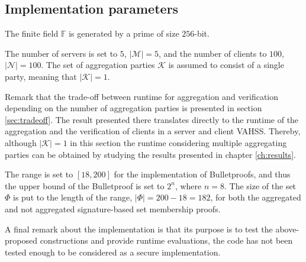 \subsection*{Implementation parameters}
The finite field $\mathds{F}$ is generated by a prime of size $256$-bit.

The number of servers is set to $5$, $|\mathcal{M}|=5$,  and the number of clients to $100$, $|\mathcal{N}|=100$.  The set of aggregation parties $\mathcal{K}$ is assumed to consist of a single party, meaning that $|\mathcal{K}|=1$.

Remark that the trade-off between runtime for aggregation and verification depending on the number of aggregation parties is presented in section \ref{sec:tradeoff}.  The result presented there translates directly to the runtime of the aggregation and the verification of clients in a server and client VAHSS.  Thereby, although $|\mathcal{K}|=1$ in this section the runtime considering multiple aggregating parties can be obtained by studying the results presented in chapter \ref{ch:results}.

The range is set to $[18,200]$ for the implementation of Bulletproofs, and thus the upper bound of the Bulletproof is set to $2^n$, where $n=8$. The size of the set $\Phi$ is put to the length of the range, $|\Phi|=200-18 = 182$, for both the aggregated and not aggregated signature-based set membership proofs. 

A final remark about the implementation is that its purpose is to test the above-proposed constructions and provide runtime evaluations, the code has not been tested enough to be considered as a secure implementation.





